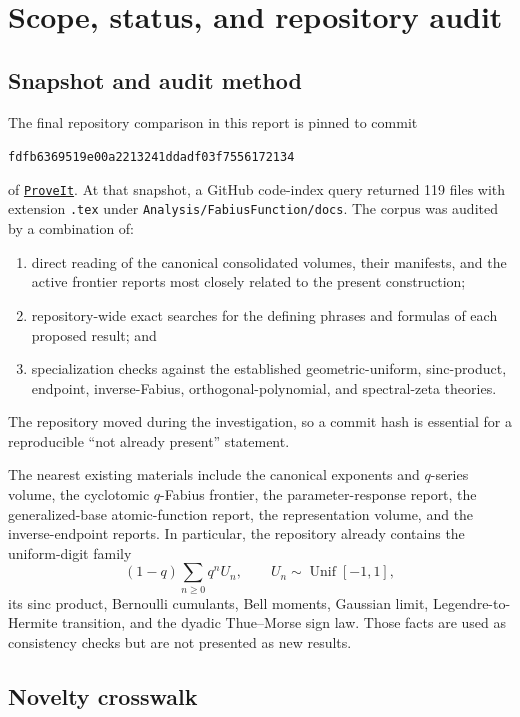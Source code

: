 \documentclass[11pt]{article}
\theoremstyle{definition}
\theoremstyle{remark}
\newcommand{\repo}{\texttt{ProveIt}}
\begin{document}
\tableofcontents
\clearpage

\section{Scope, status, and repository audit}

\subsection{Snapshot and audit method}

The final repository comparison in this report is pinned to commit
\begin{center}
\nolinkurl{fdfb6369519e00a2213241ddadf03f7556172134}
\end{center}
\noindent of
\href{https://github.com/VladimirReshetnikov/ProveIt}{\repo}.  At that snapshot,
a GitHub code-index query returned 119 files with extension \texttt{.tex}
under \texttt{Analysis/FabiusFunction/docs}.  The corpus was audited by a
combination of:
\begin{enumerate}[label=(\roman*)]
 \item direct reading of the canonical consolidated volumes, their manifests,
       and the active frontier reports most closely related to the present
       construction;
 \item repository-wide exact searches for the defining phrases and formulas
       of each proposed result; and
 \item specialization checks against the established geometric-uniform,
       sinc-product, endpoint, inverse-Fabius, orthogonal-polynomial, and
       spectral-zeta theories.
\end{enumerate}
The repository moved during the investigation, so a commit hash is essential
for a reproducible ``not already present'' statement.

The nearest existing materials include the canonical exponents and
\(q\)-series volume, the cyclotomic \(q\)-Fabius frontier, the parameter-response
report, the generalized-base atomic-function report, the representation
volume, and the inverse-endpoint reports.  In particular, the repository
already contains the uniform-digit family
\[
 (1-q)\sum_{n\ge0}q^n U_n,\qquad U_n\sim\operatorname{Unif}[-1,1],
\]
its sinc product, Bernoulli cumulants, Bell moments, Gaussian limit,
Legendre-to-Hermite transition, and the dyadic Thue--Morse sign law.  Those
facts are used as consistency checks but are not presented as new results.

\subsection{Novelty crosswalk}
\end{document}
